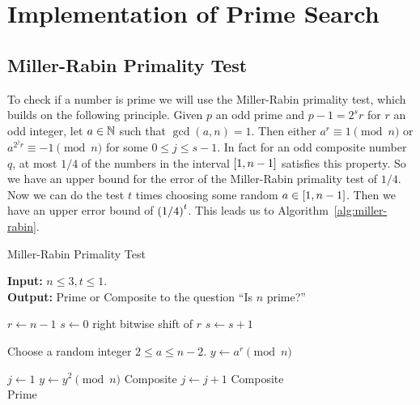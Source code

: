 \section{Implementation of Prime Search}

\subsection{Miller-Rabin Primality Test}

  To check if a number is prime we will use the Miller-Rabin primality test, which builds on the following principle.
  Given $p$ an odd prime and $p-1 = 2^s r$ for $r$ an odd integer, let $a \in \mathbb{N}$ such that $\operatorname{gcd}(a, n) = 1$.
  Then either $a^r \equiv 1 \pmod{n}$ or $a^{2^j r} \equiv -1 \pmod{n}$ for some $0 \leq j \leq s-1$.
  In fact for an odd composite number $q$, at most $1/4$ of the numbers in the interval $\left[ 1, n-1 \right]$ satisfies this property.
  So we have an upper bound for the error of the Miller-Rabin primality test of $1/4$.
  Now we can do the test $t$ times choosing some random $a \in \left[ 1, n-1 \right]$.
  Then we have an upper error bound of $\left( 1/4 \right)^t$.
  This leads us to Algorithm~\ref{alg:miller-rabin}.
  
  \begin{algorithm}
    \caption{Miller-Rabin Primality Test}
    \label{alg:miller-rabin}
    \textbf{Input:} $n \leq 3, t \leq 1$. \\
    \textbf{Output:} Prime or Composite to the question ``Is $n$ prime?''
    \begin{algorithmic}[1]
      \State $r \gets n-1$
      \State $s \gets 0$
        \State right bitwise shift of $r$
        \State $s \gets s+1$
      \EndWhile

        \State Choose a random integer $2 \leq a \leq n-2$.
        \State $y \gets a^r \pmod{n}$
        
          \State $j \gets 1$
            \State $y \gets y^2 \pmod{n}$
              \Return Composite
            \EndIf
            \State $j \gets j+1$
          \EndWhile
            \Return Composite
          \EndIf
        \EndIf    
      \EndFor \\
      \Return Prime
    \end{algorithmic}
  \end{algorithm}

